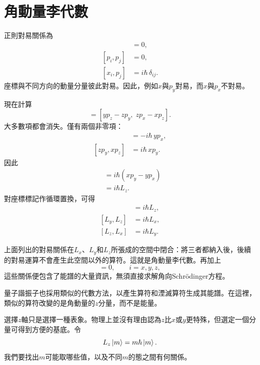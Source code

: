\section{角動量李代數}

正則對易關係為
\begin{align}
[x_i,x_j]&=0,\\
[p_i,p_j]&=0,\\
[x_i,p_j]&=i\hbar\,\delta_{ij}.
\end{align}
座標與不同方向的動量分量彼此對易。因此，例如\(x\)與\(p_y\)對易，而\(x\)與\(p_x\)不對易。

現在計算
\begin{equation}
[L_x,L_y]
=
[yp_z-zp_y,\;zp_x-xp_z].
\end{equation}
大多數項都會消失。僅有兩個非零項：
\begin{align}
[yp_z,zp_x]&=-i\hbar\,yp_x,\\
[zp_y,xp_z]&=i\hbar\,xp_y.
\end{align}
因此
\begin{align}
[L_x,L_y]
&=i\hbar\left(xp_y-yp_x\right)\\
&=i\hbar L_z.
\end{align}
對座標標記作循環置換，可得
\begin{align}
[L_x,L_y]&=i\hbar L_z,\\
[L_y,L_z]&=i\hbar L_x,\\
[L_z,L_x]&=i\hbar L_y.
\end{align}

\begin{classroomqa}
\end{classroomqa}

上面列出的對易關係在\(L_x\)、\(L_y\)和\(L_z\)所張成的空間中閉合：將三者都納入後，後續的對易運算不會產生此空間以外的算符。這就是角動量李代數。再加上
\begin{equation}
[H,L_i]=0,
\qquad i=x,y,z,
\end{equation}
這些關係便包含了能譜的大量資訊，無須直接求解角向Schr\"odinger方程。

量子諧振子也採用類似的代數方法，以產生算符和湮滅算符生成其能譜。在這裡，類似的算符改變的是角動量的\(z\)分量，而不是能量。

選擇\(z\)軸只是選擇一種表象。物理上並沒有理由認為\(z\)比\(x\)或\(y\)更特殊，但選定一個分量可得到方便的基底。令
\begin{equation}
L_z\left\lvert m\right\rangle=m\hbar\left\lvert m\right\rangle.
\end{equation}
我們要找出\(m\)可能取哪些值，以及不同\(m\)的態之間有何關係。

